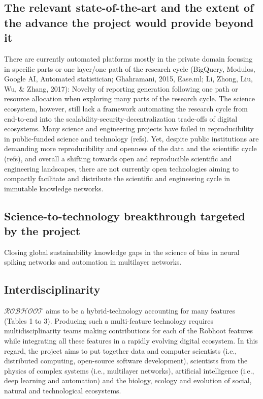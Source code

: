 \documentclass[12pt, a4paper]{article} %
\begin{document}
\subsection{The relevant state-of-the-art and the extent of the
  advance the project would provide beyond it}

There are currently automated platforms mostly in the private domain
focusing in specific parts or one layer/one path of the research cycle
(BigQuery, Modulos, Google AI, Automated statistician; Ghahramani,
2015, Ease.ml; Li, Zhong, Liu, Wu, & Zhang, 2017)⁠: Novelty of
reporting generation following one path or resource allocation when
exploring many parts of the research cycle. The science ecosystem,
however, still lack a framework automating the research cycle from
end-to-end into the scalability-security-decentralization trade-offs
of digital ecosystems. Many science and engineering projects have
failed in reproducibility in public-funded science and technology
(refs). Yet, despite public institutions are demanding more
reproducibility and openness of the data and the scientific cycle
(refs), and overall a shifting towards open and reproducible
scientific and engineering landscapes, there are not currently open
technologies aiming to compactly facilitate and distribute the
scientific and engineering cycle in immutable knowledge networks.


\subsection{Science-to-technology breakthrough targeted by the
  project}
Closing global sustainability knowledge gaps in the science of bias in
neural spiking networks and automation in multilayer networks.


\subsection{Interdisciplinarity}
{\bf $\mathcal{ROBHOOT}$} aims to be a hybrid-technology accounting
for many features (Tables 1 to 3). Producing such a multi-feature
technology requires multidisciplinarity teams making contributions for
each of the Robhoot features while integrating all these features in a
rapidly evolving digital ecosystem. In this regard, the project aims
to put together data and computer scientists (i.e., distributed
computing, open-source software development), scientists from the
physics of complex systems (i.e., multilayer networks), artificial
intelligence (i.e., deep learning and automation) and the biology,
ecology and evolution of social, natural and technological ecosystems.
\end{document}
